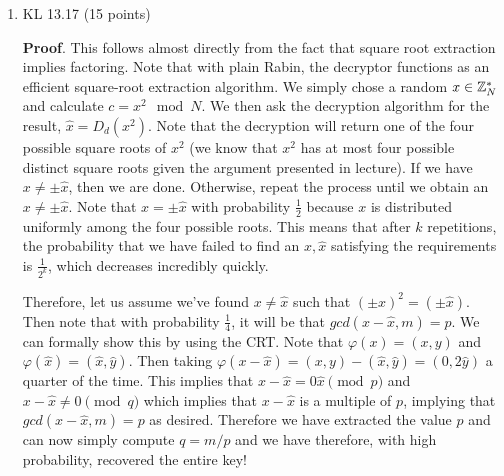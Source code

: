 \documentclass{article}
\begin{document}
\begin{enumerate}[,start=4]
\item{}
KL 13.17 (15 points)%

\begin{mdbmarginx}{1ex}{0pt}{1ex}{0pt}%
\noindent{}\textbf{Proof}.  
This follows almost directly from the fact that square root extraction implies factoring. Note that with
plain Rabin, the decryptor functions as an efficient square-root extraction algorithm. We simply chose a
random $x \in \mathbb{Z}_N^*$ and calculate $c = x^2 \mod N$. We then ask the decryption algorithm for the result,
$\hat{x} = D_d(x^2)$. Note that the decryption will return one of the four possible square roots of 
$x^2$ (we know that $x^2$ has at most four possible distinct square roots given the argument presented in lecture).
If we have $x \neq \pm \hat{x}$, then we are done. Otherwise, repeat the process until we obtain
an $x \neq \pm \hat{x}$. Note that $x = \pm\hat{x}$ with probability $\frac{1}{2}$ because $x$ is distributed
uniformly among the four possible roots. This means that after $k$ repetitions, the probability that 
we have failed to find an $x,\hat{x}$ satisfying the requirements is $\frac{1}{2^k}$, which decreases
incredibly quickly.%

Therefore, let us assume we've found $x \neq \hat{x}$ such that $(\pm x)^2 = (\pm \hat{x})$. Then note
that with probability $\frac{1}{4}$, it will be that $gcd(x - \hat{x},m) = p$. We can formally show
this by using the CRT. Note that $\varphi(x) = (x,y)$ and $\varphi(\hat{x}) = (\hat{x},\hat{y})$. Then 
taking $\varphi(x - \hat{x}) = (x,y) - (\hat{x},\hat{y}) = (0,2\hat{y})$ a quarter of the time. This implies that 
$x-\hat{x} = 0 \hat{x} \pmod{p}$ and $x - \hat{x} \neq 0 \pmod{q}$ which implies that $x - \hat{x}$ is a
multiple of $p$, implying that $gcd(x - \hat{x}, m) = p$ as desired. Therefore we have extracted the
value $p$ and can now simply compute $q = m /p$ and we have therefore, with high probability, recovered
the entire key!%
\end{mdbmarginx}%
\end{enumerate}%
\end{document}
